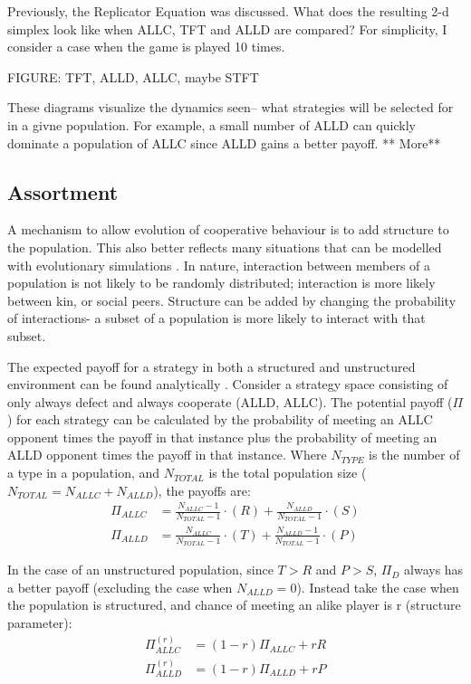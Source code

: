 \documentclass[a4paper,11pt,bcshonoursthesis,singlespace,twoside,thesisdraft,pdflatex]{cssethesis}
\begin{document}
Previously, the Replicator Equation was discussed. 
What does the resulting 2-d simplex look like when ALLC, TFT and ALLD are compared? 
For simplicity, I consider a case when the game is played 10 times. 

FIGURE: TFT, ALLD, ALLC, maybe STFT
 
These diagrams visualize the dynamics seen-- what strategies will be selected for in a givne population\citep{imhof:PNAS:2005}. 
For example, a small number of ALLD can quickly dominate a population of ALLC since ALLD gains a better payoff. ** More**

\subsection{Assortment}
A mechanism to allow evolution of cooperative behaviour is to add structure to the population. 
This also better reflects many situations that can be modelled with evolutionary simulations \citep{eshel:PNAS:1982}. 
In nature, interaction between members of a population is not likely to be randomly distributed; interaction is more likely between kin, or social peers. 
Structure can be added by changing the probability of interactions- a subset of a population is more likely to interact with that subset. 

The expected payoff for a strategy in both a structured and unstructured environment can be found analytically \citep{van-veelen:PNAS:2012}. 
Consider a strategy space consisting of only always defect and always cooperate (ALLD, ALLC). 
The potential payoff ($\Pi$) for each strategy can be calculated by the probability of meeting an ALLC opponent times the payoff in that instance plus the probability of meeting an ALLD opponent times the payoff in that instance. Where $N_{TYPE}$ is the number of a type in a population, and $N_{TOTAL}$ is the total population size ($N_{TOTAL}=N_{ALLC}+ N_{ALLD}$), the payoffs are:
\begin{align*}
\Pi_{ALLC}&=\frac{N_{ALLC}-1}{N_{TOTAL}-1} \cdot (R) + \frac{N_{ALLD}}{N_{TOTAL}-1}\cdot ({S})\\
\Pi_{ALLD}&=\frac{N_{ALLC}}{N_{TOTAL}-1} \cdot (T) + \frac{N_{ALLD}-1}{N_{TOTAL}-1}\cdot ({P})
\end{align*}

In the case of an unstructured population, since $T>R$ and $P>S$, $\Pi_D$ always has a better payoff (excluding the case when $N_{ALLD}=0$). 
Instead take the case when the population is structured, and chance of meeting an alike player is r (structure parameter):
\begin{align*}
\Pi^{(r)}_{ALLC}&=(1-r)\Pi_{ALLC}+ rR\\
\Pi^{(r)}_{ALLD}&=(1-r)\Pi_{ALLD}+ rP
\end{align*}
\end{document}
